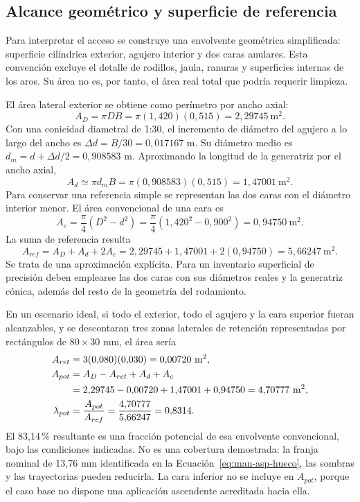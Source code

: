 \subsection{Alcance geométrico y superficie de referencia}
\label{sec:man-asp-superficie}

Para interpretar el acceso se construye una envolvente geométrica
simplificada: superficie cilíndrica exterior, agujero interior y dos
caras anulares. Esta convención excluye el detalle de rodillos, jaula,
ranuras y superficies internas de los aros. Su área no es, por tanto,
el área real total que podría requerir limpieza.

El área lateral exterior se obtiene como perímetro por ancho axial:
\begin{equation}
 A_D=\pi DB=\pi(1{,}420)(0{,}515)=2{,}29745\ \mathrm{m^2}.
\end{equation}
Con una conicidad diametral de 1:30, el incremento de diámetro del
agujero a lo largo del ancho es $\Delta d=B/30=0{,}017167$ m. Su diámetro
medio es $d_m=d+\Delta d/2=0{,}908583$ m. Aproximando la longitud de la
generatriz por el ancho axial,
\begin{equation}
 A_d\simeq\pi d_mB=\pi(0{,}908583)(0{,}515)
 =1{,}47001\ \mathrm{m^2}.
\end{equation}
Para conservar una referencia simple se representan las dos caras con
el diámetro interior menor. El área convencional de una cara es
\begin{equation}
 A_c=\frac{\pi}{4}(D^2-d^2)
 =\frac{\pi}{4}(1{,}420^2-0{,}900^2)
 =0{,}94750\ \mathrm{m^2}.
\end{equation}
La suma de referencia resulta
\begin{equation}
 A_{ref}=A_D+A_d+2A_c
 =2{,}29745+1{,}47001+2(0{,}94750)
 =\boxed{5{,}66247\ \mathrm{m^2}}.
 \label{eq:man-asp-aref}
\end{equation}
Se trata de una aproximación explícita. Para un inventario superficial
de precisión deben emplearse las dos caras con sus diámetros reales y
la generatriz cónica, además del resto de la geometría del rodamiento.

En un escenario ideal, si todo el exterior, todo el agujero y la cara
superior fueran alcanzables, y se descontaran tres zonas laterales de
retención representadas por rectángulos de $80\times30$ mm, el área sería
\begin{align}
 A_{ret}&=3(0{,}080)(0{,}030)=0{,}00720\ \mathrm{m^2},\\
 A_{pot}&=A_D-A_{ret}+A_d+A_c\notag\\
 &=2{,}29745-0{,}00720+1{,}47001+0{,}94750
 =4{,}70777\ \mathrm{m^2},\\
 \lambda_{pot}&=\frac{A_{pot}}{A_{ref}}
 =\frac{4{,}70777}{5{,}66247}=0{,}8314.
 \label{eq:man-asp-lambda}
\end{align}
El 83,14\,\% resultante es una fracción potencial de esa envolvente
convencional, bajo las condiciones indicadas. No es una cobertura
demostrada: la franja nominal de 13,76 mm identificada en la
Ecuación~\eqref{eq:man-asp-hueco}, las sombras y las trayectorias pueden
reducirla. La cara inferior no se incluye en $A_{pot}$, porque el caso
base no dispone una aplicación ascendente acreditada hacia ella.

